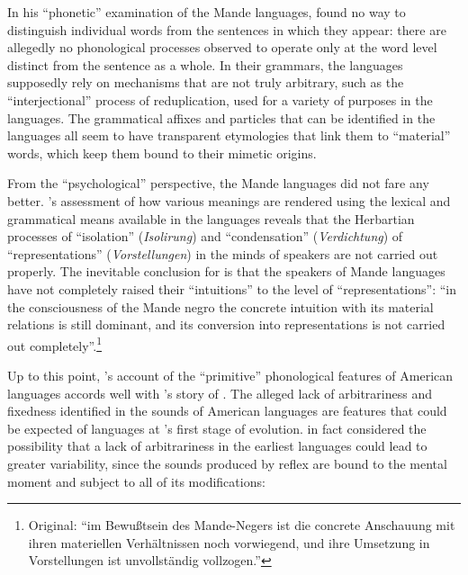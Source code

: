 \documentclass[output=paper]{langscibook}
\begin{document}
In his ``phonetic'' examination of the Mande languages, {\Steinthal} found no way to distinguish individual words from the sentences in which they appear: there are allegedly no phonological processes observed to operate only at the word level distinct from the sentence as a whole. In their grammars, the languages supposedly rely on mechanisms that are not truly arbitrary, such as the ``interjectional'' process of reduplication, used for a variety of purposes in the languages. The grammatical affixes and particles that can be identified in the languages all seem to have transparent etymologies that link them to ``material'' words, which keep them bound to their mimetic origins. 

From the ``psychological'' perspective, the Mande languages did not fare any better. {\Steinthal}'s assessment of how various meanings are rendered using the lexical and grammatical means available in the languages reveals that the Herbartian processes of ``isolation'' (\emph{Isolirung}) and ``condensation'' (\emph{Verdichtung}) of ``representations'' (\emph{Vorstellungen}) in the minds of speakers are not carried out properly. The inevitable conclusion for \citet[255]{Steinthal1867} is that the speakers of Mande languages have not completely raised their ``intuitions'' to the level of ``representations'': ``in the consciousness of the Mande negro the concrete intuition with its material relations is still dominant, and its conversion into representations is not carried out completely''.\footnote{Original: ``im Bewußtsein des Mande-Negers ist die concrete Anschauung mit ihren materiellen Verhältnissen noch vorwiegend, und ihre Umsetzung in Vorstellungen ist unvollständig vollzogen.''}

Up to this point, {\Brinton}'s account of the ``primitive'' phonological features of American languages accords well with {\Steinthal}'s story of . The alleged lack of arbitrariness and fixedness {\Brinton} identified in the sounds of American languages are features that could be expected of languages at {\Steinthal}'s first stage of evolution. {\Steinthal} in fact considered the possibility that a lack of arbitrariness in the earliest languages could lead to greater variability, since the sounds produced by reflex are bound to the mental moment and subject to all of its modifications:
\end{document}
